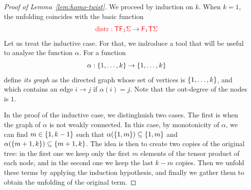\begin{proof}[Proof of Lemma~\ref{lem:homo-twist}]
We proceed by induction on $k$. When $k=1$, the unfolding coincides with the basic function 
\begin{align*}
{\color{red}{{\color{red}{\mathrm{distr}}}: {\color{red}{\mathsf T}}{\color{red}{\mathsf F_{1}}}\Sigma \to {{\color{red}{\mathsf F_{1}}}{\color{red}{\mathsf T}}\Sigma}}}
\end{align*}
Let us treat the inductive case. For that, we indroduce a tool that will be useful to analyse the function $\alpha$. For a function $$\alpha: \{1,\ldots,k\} \to \{1,\ldots,k\}$$ define  \emph{its graph} as the directed graph whose set of vertices is $\{1,\ldots,k\}$, and which contains an edge $i\rightarrow j$ if $\alpha(i)=j$. Note that the out-degree of the nodes is $1.$

\medskip
In the proof of the inductive case, we distinghuish two cases. The first is when the graph of $\alpha$ is not weakly connected. In this case, by monotonicity of $\alpha$, we can find $m\in \{1,k-1\}$ such that $\alpha(\{1,m\})\subseteq\{1,m\}$ and $\alpha(\{m+1,k\})\subseteq\{m+1,k\}$. The idea is then to create two copies of the original tree: in the first one we keep only the first $m$ elements of the tensor product of each node, and in the second one we keep the last $k-m$ copies. Then we unfold these terms by applying the induction hypothesis, and  finally we gather them to obtain the  unfolding of the original term. 


\end{proof}
